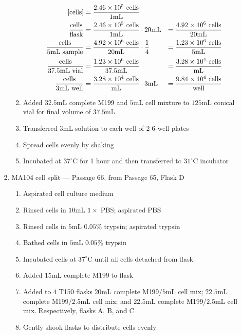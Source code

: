 \begin{enumerate}
\begin{enumerate}
				\begin{align*}
				\text{[cells]} &= \frac{2.46\times 10^{5}\text{ cells}}{1\text{mL}} \\
				\frac{\text{cells}}{\text{flask}} &= \frac{2.46\times 10^{5}\text{ cells}}{1\text{mL}} \cdot 20\text{mL} &= \frac{4.92\times 10^{6}\text{ cells}}{20\text{mL}}\\
				\frac{\text{cells}}{5\text{mL sample}} &= \frac{4.92\times 10^{6}\text{ cells}}{20\text{mL}}\cdot \frac{1}{4} &= \frac{1.23\times 10^{6}\text{ cells}}{5\text{mL}}\\
				\frac{\text{cells}}{37.5\text{mL vial}} &= \frac{1.23\times 10^{6}\text{ cells}}{37.5\text{mL}} &= \frac{3.28\times 10^{4}\text{ cells}}{\text{mL}}\\
				\frac{\text{cells}}{3\text{mL well}} &= \frac{3.28\times 10^{4}\text{ cells}}{\text{mL}} \cdot 3\text{mL} &= \frac{9.84\times 10^{4}\text{ cells}}{\text{well}}\\
				\end{align*}
			\item Added $32.5$mL complete M199 and $5$mL cell mixture to $125$mL conical vial for final volume of $37.5$mL
			\item Transferred $3$mL solution to each well of 2 6-well plates
			\item Spread cells evenly by shaking
			\item Incubated at $37^{\circ}$C for 1 hour and then transferred to $31^{\circ}$C incubator
		\end{enumerate}
	\item MA104 cell split --- Passage 66, from Passage 65, Flask D
		\begin{enumerate}
			\item Aspirated cell culture medium
			\item Rinsed cells in $10$mL $1\times$ PBS; aspirated PBS
			\item Rinsed cells in $5$mL $0.05$\% trypsin; aspirated trypsin
			\item Bathed cells in $5$mL $0.05$\% trypsin
			\item Incubated cells at $37^{\circ}$C until all cells detached from flask
			\item Added $15$mL complete M199 to flask
			\item Added to $4$ T150 flasks $20$mL complete M199/$5$mL cell mix; $22.5$mL complete M199/$2.5$mL cell mix; and $22.5$mL complete M199/$2.5$mL cell mix. Respectively, flasks A, B, and C
			\item Gently shook flasks to distribute cells evenly

\end{enumerate}
\end{enumerate}
